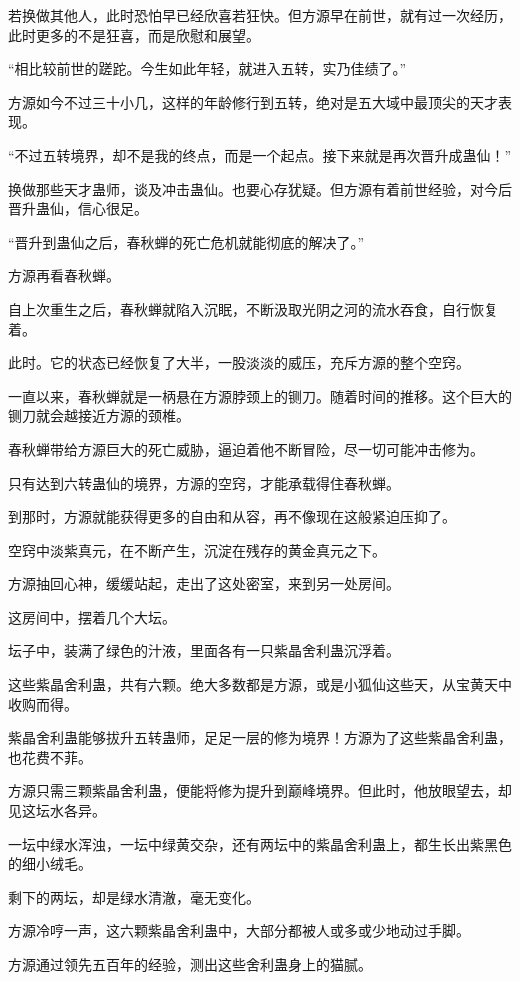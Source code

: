 \begin{this_body}
若换做其他人，此时恐怕早已经欣喜若狂快。但方源早在前世，就有过一次经历，此时更多的不是狂喜，而是欣慰和展望。

“相比较前世的蹉跎。今生如此年轻，就进入五转，实乃佳绩了。”

方源如今不过三十小几，这样的年龄修行到五转，绝对是五大域中最顶尖的天才表现。

“不过五转境界，却不是我的终点，而是一个起点。接下来就是再次晋升成蛊仙！”

换做那些天才蛊师，谈及冲击蛊仙。也要心存犹疑。但方源有着前世经验，对今后晋升蛊仙，信心很足。

“晋升到蛊仙之后，春秋蝉的死亡危机就能彻底的解决了。”

方源再看春秋蝉。

自上次重生之后，春秋蝉就陷入沉眠，不断汲取光阴之河的流水吞食，自行恢复着。

此时。它的状态已经恢复了大半，一股淡淡的威压，充斥方源的整个空窍。

一直以来，春秋蝉就是一柄悬在方源脖颈上的铡刀。随着时间的推移。这个巨大的铡刀就会越接近方源的颈椎。

春秋蝉带给方源巨大的死亡威胁，逼迫着他不断冒险，尽一切可能冲击修为。

只有达到六转蛊仙的境界，方源的空窍，才能承载得住春秋蝉。

到那时，方源就能获得更多的自由和从容，再不像现在这般紧迫压抑了。

空窍中淡紫真元，在不断产生，沉淀在残存的黄金真元之下。

方源抽回心神，缓缓站起，走出了这处密室，来到另一处房间。

这房间中，摆着几个大坛。

坛子中，装满了绿色的汁液，里面各有一只紫晶舍利蛊沉浮着。

这些紫晶舍利蛊，共有六颗。绝大多数都是方源，或是小狐仙这些天，从宝黄天中收购而得。

紫晶舍利蛊能够拔升五转蛊师，足足一层的修为境界！方源为了这些紫晶舍利蛊，也花费不菲。

方源只需三颗紫晶舍利蛊，便能将修为提升到巅峰境界。但此时，他放眼望去，却见这坛水各异。

一坛中绿水浑浊，一坛中绿黄交杂，还有两坛中的紫晶舍利蛊上，都生长出紫黑色的细小绒毛。

剩下的两坛，却是绿水清澈，毫无变化。

方源冷哼一声，这六颗紫晶舍利蛊中，大部分都被人或多或少地动过手脚。

方源通过领先五百年的经验，测出这些舍利蛊身上的猫腻。


\end{this_body}
